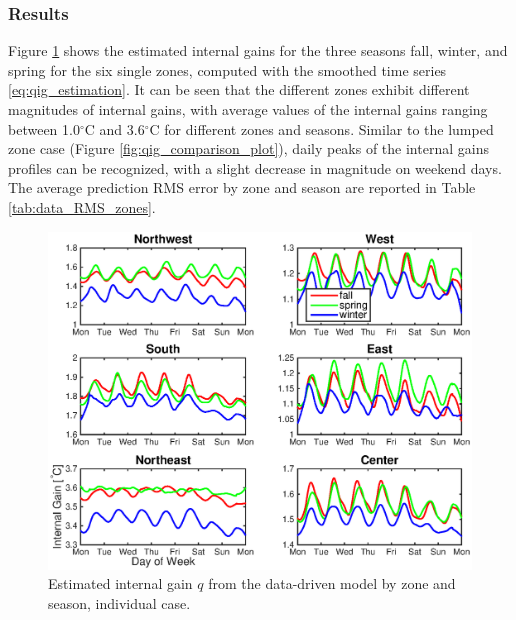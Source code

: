 \subsubsection{Results}
Figure \ref{fig:qig_seasons_indiv} shows the estimated internal gains for the three seasons fall, winter, and spring for the six single zones, computed with the smoothed time series \eqref{eq:qig_estimation}. It can be seen that the different zones exhibit different magnitudes of internal gains, with average values of the internal gains ranging between 1.0$^{\circ}$C and 3.6$^{\circ}$C for different zones and seasons. Similar to the lumped zone case (Figure \ref{fig:qig_comparison_plot}), daily peaks of the internal gains profiles can be recognized, with a slight decrease in magnitude on weekend days. The average prediction RMS error by zone and season are reported in Table \ref{tab:data_RMS_zones}.	

\begin{figure}[hbtp]
\centering
\includegraphics[width=\textwidth]{chapters/building_model/figures/data_indiv_qig.eps}
\vspace*{-0.5cm}
\caption{Estimated internal gain $q$ from the data-driven model by zone and season, individual case.}
\label{fig:qig_seasons_indiv}
\end{figure}

